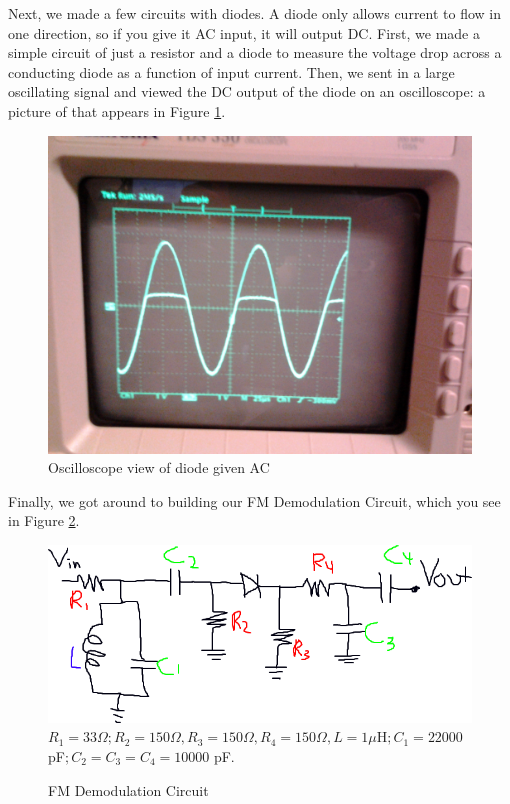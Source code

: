 \documentclass[11pt]{article}
\newcommand{\Ohm}{\Omega}
\begin{document}
Next, we made a few circuits with diodes. A diode only allows current to flow in one direction, so if you give it AC
input, it will output DC. First, we made a simple circuit of just a resistor and a diode to measure the voltage drop
across a conducting diode as a function of input current. Then, we 
sent in a large oscillating signal and viewed the DC output of the diode on an oscilloscope: a picture of that appears
in Figure \ref{OSCI}. 
\begin{figure}
\centering
\includegraphics[scale=0.1]{diode}
\caption{Oscilloscope view of diode given AC \label{OSCI}}
\end{figure}

Finally, we got around to building our FM Demodulation Circuit, which
you see in Figure \ref{FMDEMOD}.
\begin{figure}
\centering
\includegraphics[scale=0.6]{circuit}
\\ 
$R_1 = 33 \Ohm; R_2 = 150\Ohm, R_3 = 150 \Ohm, R_4 = 150 \Ohm, L = 1 \mu$H$; C_1 = 22000$ pF$; C_2 = C_3 = C_4 = 10000$ pF.
\\
\caption{FM Demodulation Circuit \label{FMDEMOD}}
\end{figure}
\end{document}
